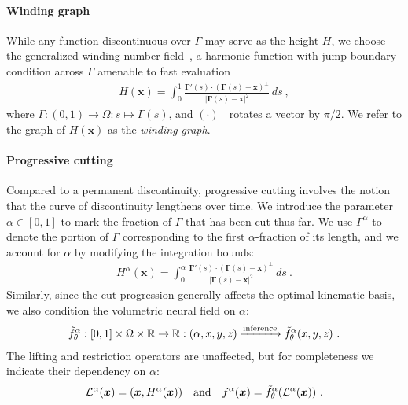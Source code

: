 \paragraph{Winding graph}
While any function discontinuous over $\Gamma$ may serve as the height $H$, we choose the generalized winding number field~\cite{Jacobson:2018:GWN}, a harmonic function with jump boundary condition across $\Gamma$ amenable to fast evaluation~\cite{Barill:FW:2018} 
\begin{align}
\label{eq:fixedUpper}
    H(\mathbf{x}) = \int_{0}^{1} \frac{\mathbf{\Gamma}'(s) \cdot (\mathbf{\Gamma}(s) - \mathbf{x})^\perp}{|\mathbf{\Gamma}(s) - \mathbf{x}|^2} \, ds \ ,
\end{align}
where $\Gamma : (0,1) \rightarrow \Omega : s \mapsto \Gamma(s)$, and
$(\cdot)^\perp$ rotates a vector by $\pi/2$. We refer to the graph of $H(\mathbf{x})$ as the \emph{winding graph}.

\paragraph{Progressive cutting} 
Compared to a permanent discontinuity, progressive cutting involves the notion that the curve of discontinuity lengthens over time. We introduce the parameter $\alpha \in [0,1]$ to mark the fraction of $\Gamma$ that has been cut thus far. We use $\Gamma^\alpha$ to denote the portion of $\Gamma$ corresponding to the first $\alpha$-fraction of its length, and we account for $\alpha$ by modifying the integration bounds:
\begin{align}
\label{eq:winding_para}
    H^\alpha(\mathbf{x}) = \int_{0}^{\alpha} \frac{\mathbf{\Gamma}'(s) \cdot (\mathbf{\Gamma}(s) - \mathbf{x})^\perp}{|\mathbf{\Gamma}(s) - \mathbf{x}|^2} \, ds \ .
\end{align}
Similarly, since the cut progression generally affects the optimal kinematic basis, we also condition the volumetric neural field on $\alpha$:
\begin{align} \label{eq:neural_para}
    \Tilde{f}^\alpha_\theta : [0,1] \times \Omega \times \mathbb{R} \rightarrow \mathbb{R} : (\alpha,x,y,z) \xmapsto{\textrm{\scriptsize inference}}   \Tilde{f}^\alpha_{\theta}(x,y,z)  \ .
\end{align}
The lifting and restriction operators are unaffected, but for completeness we indicate their dependency on $\alpha$:
\begin{align} \label{eq:lifting_para}
    \mathcal{L}^\alpha(\bm{x}) = (\bm{x},H^\alpha(\bm{x}))  \quad \textrm{and}\quad
    f^\alpha(\bm{x}) = \Tilde{f}^\alpha_{\theta}(\mathcal{L}^\alpha(\bm{x})) \ .
\end{align}


